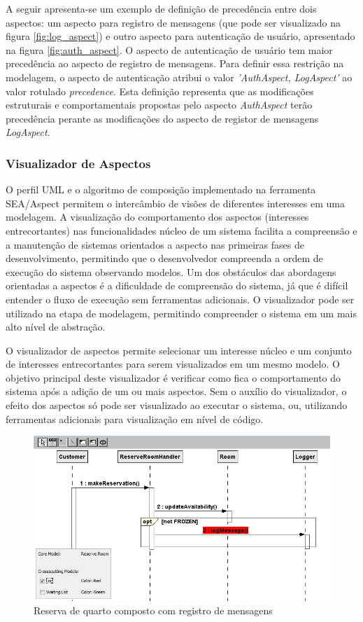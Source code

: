 A seguir apresenta-se um exemplo de definição de precedência entre dois aspectos: um aspecto para
registro de mensagens (que pode ser visualizado na figura \ref{fig:log_aspect}) e outro aspecto para autenticação de usuário, apresentado 
na figura \ref{fig:auth_aspect}. O aspecto de autenticação de usuário tem maior precedência ao aspecto de registro de mensagens. Para definir essa 
restrição na modelagem, o aspecto de autenticação atribui o valor \textit{'AuthAspect, LogAspect'} ao valor rotulado \textit{precedence}. Esta
definição representa que as modificações estruturais e comportamentais propostas pelo aspecto \textit{AuthAspect} terão precedência perante as 
modificações do aspecto de registor de mensagens \textit{LogAspect}.

\subsubsection{Visualizador de Aspectos}

O perfil UML e o algoritmo de composição implementado na ferramenta SEA/Aspect permitem o intercâmbio de visões de diferentes interesses em
uma modelagem. A visualização do comportamento dos aspectos (interesses entrecortantes) nas funcionalidades núcleo de um sistema facilita a
compreensão e a manutenção de sistemas orientados a aspecto nas primeiras fases de desenvolvimento, permitindo que o desenvolvedor compreenda a ordem de execução do
sistema observando modelos. Um dos obstáculos das abordagens orientadas a aspectos é a dificuldade de compreensão do sistema, já que é difícil
entender o fluxo de execução sem ferramentas adicionais. O visualizador pode ser utilizado na etapa de modelagem, permitindo compreender o sistema em
um mais alto nível de abstração. 

O visualizador de aspectos permite selecionar um interesse núcleo e um conjunto de interesses entrecortantes para serem visualizados em um mesmo
modelo. O objetivo principal deste visualizador é verificar como fica o comportamento do sistema após a adição de um ou mais aspectos. Sem o
auxílio do visualizador, o efeito dos aspectos só pode ser visualizado ao executar o sistema, ou, utilizando ferramentas adicionais para visualização
em nível de código.

  \begin{figure}[!h]
	\centering
	\includegraphics[scale=0.8]{img/case_study_compound_1.png}
	\caption{Reserva de quarto composto com registro de mensagens}\label{fig:case_study_compound_1}
  \end{figure}

